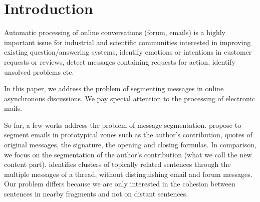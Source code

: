 
\section{Introduction}
\label{sec:introduction}

Automatic processing of online conversations (forum, emails) is a highly important issue for industrial and scientific communities interested in improving existing question/answering systems, identify emotions or intentions in customer requests or reviews, detect messages containing requests for action, identify unsolved problems etc.

%
%
In this paper, we address the problem of segmenting messages in online asynchronous discussions. 
%
We pay special attention to the processing of electronic mails.

%
%
%
%
%
So far, a few works address the problem of message segmentation.
%
\cite{lampert:2009:emnlp} propose to segment emails in prototypical zones such as the author's contribution, quotes of original messages, the signature, the opening and closing formulas. 
%
In comparison, we focus on the segmentation of the author's contribution (what we call the new content part).
%
\cite{joty:2013:jair} identifies clusters of topically related sentences through the multiple messages of a thread, without distinguishing email and forum messages. Our problem differs because we are only interested in the cohesion between sentences in nearby fragments and not on distant sentences.

